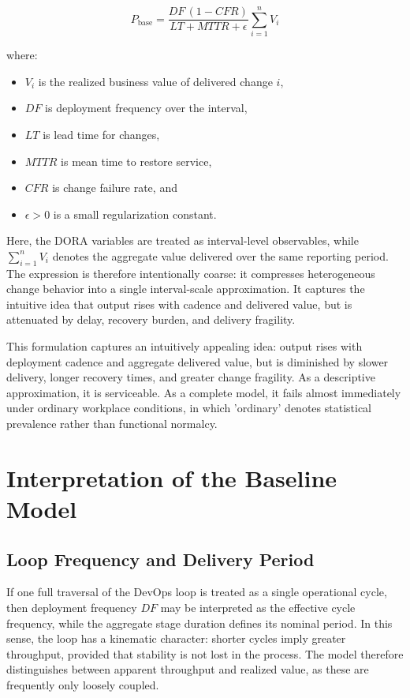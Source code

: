 \documentclass[letterpaper]{article}
\begin{document}
\begin{equation}
P_{\mathrm{base}}
=
\frac{DF\,(1-CFR)}{LT + MTTR + \epsilon}
\sum_{i=1}^{n} V_i
\end{equation}

where:
\begin{itemize}
    \item $V_i$ is the realized business value of delivered change $i$,
    \item $DF$ is deployment frequency over the interval,
    \item $LT$ is lead time for changes,
    \item $MTTR$ is mean time to restore service,
    \item $CFR$ is change failure rate, and
    \item $\epsilon > 0$ is a small regularization constant.
\end{itemize}

Here, the DORA variables are treated as interval-level observables, while $\sum_{i=1}^{n} V_i$ denotes the aggregate value delivered over the same reporting period. The expression is therefore intentionally coarse: it compresses heterogeneous change behavior into a single interval-scale approximation. It captures the intuitive idea that output rises with cadence and delivered value, but is attenuated by delay, recovery burden, and delivery fragility.


This formulation captures an intuitively appealing idea: output rises with deployment cadence and aggregate delivered value, but is diminished by slower delivery, longer recovery times, and greater change fragility.
As a descriptive approximation, it is serviceable. As a complete model, it fails almost immediately under ordinary workplace conditions, in which 'ordinary' denotes statistical prevalence rather than functional normalcy.

\section{Interpretation of the Baseline Model}

\subsection{Loop Frequency and Delivery Period}

If one full traversal of the DevOps loop is treated as a single operational cycle, then deployment frequency $DF$ may be interpreted as the effective cycle frequency, while the aggregate stage duration defines its nominal period. In this sense, the loop has a kinematic character: shorter cycles imply greater throughput, provided that stability is not lost in the process. The model therefore distinguishes between apparent throughput and realized value, as these are frequently only loosely coupled.
\end{document}
